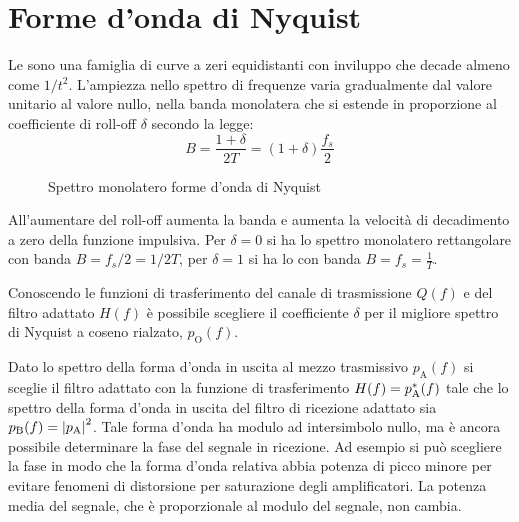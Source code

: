 \section{Forme d'onda di Nyquist} 
Le  sono una famiglia di curve a zeri equidistanti con inviluppo che decade almeno come $1/t^2$. L'ampiezza nello spettro di frequenze varia gradualmente dal valore unitario al valore nullo, nella banda monolatera che si estende in proporzione al coefficiente di roll-off $\delta$ secondo la legge: 
\begin{equation}
B=\frac{1+\delta}{2T}=(1+\delta)\frac{f_s}{2}
\label{eq:banda_nyquist}
\end{equation}

\begin{figure}[ht!]\centering
{}
\caption{Spettro monolatero forme d'onda di Nyquist}
\label{fig:spettro_forme_donda_Nyquist}
\end{figure}

All'aumentare del roll-off aumenta la banda e aumenta la velocità di decadimento a zero della funzione impulsiva.
Per $\delta=0$ si ha lo spettro monolatero rettangolare con banda $B=f_s/2=1/2T$, per $\delta=1$ si ha lo  con banda $B=f_s=\frac{1}{T}$.

Conoscendo le funzioni di trasferimento del canale di trasmissione $Q(f)$ e del filtro adattato $H(f)$ è possibile scegliere il coefficiente $\delta$ per il migliore spettro di Nyquist a coseno rialzato, $p_\text{O}(f)$.

Dato lo spettro della forma d'onda in uscita al mezzo trasmissivo $p_\text{A}(f)$ si sceglie il filtro adattato con la funzione di trasferimento $H(f)={p}^\ast_\text{A}(f)$ tale che lo spettro della forma d'onda in uscita del filtro di ricezione adattato sia $p_\text{B}(f)=\left|{p_\text{A}}\right|^2$. Tale forma d'onda ha modulo ad intersimbolo nullo, ma è ancora possibile determinare la fase del segnale in ricezione. Ad esempio si può scegliere la fase in modo che la forma d'onda relativa abbia potenza di picco minore per evitare fenomeni di distorsione per saturazione degli amplificatori. La potenza media del segnale, che è proporzionale al modulo del segnale, non cambia.

